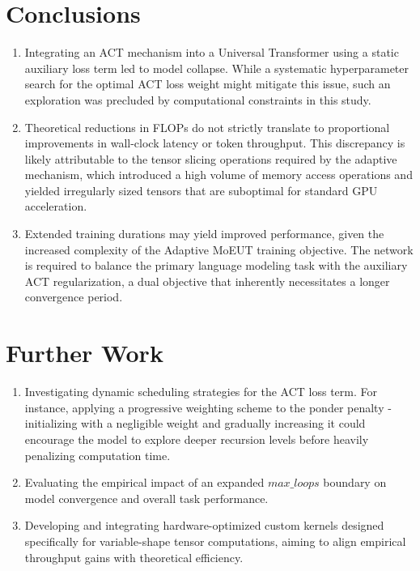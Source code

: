 \documentclass[11pt]{article}
\begin{document}
\section{Conclusions}
\begin{enumerate}
    \item Integrating an ACT mechanism into a Universal Transformer using a static auxiliary loss term led to model collapse.
    While a systematic hyperparameter search for the optimal ACT loss weight might mitigate this issue, such an exploration was precluded by computational constraints in this study.
    
    \item Theoretical reductions in FLOPs do not strictly translate to proportional improvements in wall-clock latency or token throughput.
    This discrepancy is likely attributable to the tensor slicing operations required by the adaptive mechanism, which introduced a high volume of memory access operations and yielded irregularly sized tensors that are suboptimal for standard GPU acceleration.
    
    \item Extended training durations may yield improved performance, given the increased complexity of the Adaptive MoEUT training objective.
    The network is required to balance the primary language modeling task with the auxiliary ACT regularization, a dual objective that inherently necessitates a longer convergence period.
\end{enumerate}

\section{Further Work}
\begin{enumerate}
\item Investigating dynamic scheduling strategies for the ACT loss term. For instance, applying a progressive weighting scheme to the ponder penalty - initializing with a negligible weight and gradually increasing it could encourage the model to explore deeper recursion levels before heavily penalizing computation time.

\item Evaluating the empirical impact of an expanded $max\_loops$ boundary on model convergence and overall task performance.

\item Developing and integrating hardware-optimized custom kernels designed specifically for variable-shape tensor computations, aiming to align empirical throughput gains with theoretical efficiency.
\end{enumerate}

        
\end{document}

